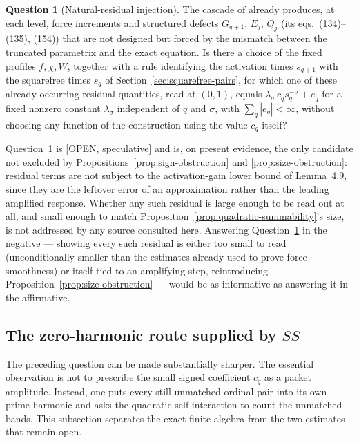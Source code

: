 \documentclass[11pt]{amsart}
\numberwithin{equation}{section}
\theoremstyle{plain}
\theoremstyle{definition}
\newtheorem{question}[theorem]{Question}
\theoremstyle{remark}
\begin{document}
\begin{question}[Natural-residual injection]
\label{q:natural-residual}
The cascade of \cite{AlpogeBuckmasterCoiculescu2026} already produces, at
each level, force increments and structured defects $G_{q+1}$, $E_j$, $Q_j$
(its eqs.~(134)--(135), (154)) that are not designed but forced by the
mismatch between the truncated parametrix and the exact equation.  Is there
a choice of the fixed profiles $f,\chi,W$, together with a rule identifying
the activation times $s_{q+1}$ with the squarefree times $s_q$ of
Section~\ref{sec:squarefree-pairs}, for which one of these already-occurring
residual quantities, read at $(0,1)$, equals $\lambda_\sigma\,c_qs_q^{-\sigma}+e_q$
for a fixed nonzero constant $\lambda_\sigma$ independent of $q$ and
$\sigma$, with $\sum_q|e_q|<\infty$, without choosing any function of the
construction using the value $c_q$ itself?
\end{question}

Question~\ref{q:natural-residual} is \textup{[OPEN, speculative]} and is, on
present evidence, the only candidate not excluded by
Propositions~\ref{prop:sign-obstruction} and \ref{prop:size-obstruction}:
residual terms are not subject to the activation-gain lower bound of
Lemma~4.9, since they are the leftover error of an approximation rather
than the leading amplified response.  Whether any such residual is large
enough to be read out at all, and small enough to match
Proposition~\ref{prop:quadratic-summability}'s size, is not addressed by any
source consulted here.  Answering Question~\ref{q:natural-residual} in the
negative --- showing every such residual is either too small to read
(unconditionally smaller than the estimates already used to prove force
smoothness) or itself tied to an amplifying step, reintroducing
Proposition~\ref{prop:size-obstruction} --- would be as informative as
answering it in the affirmative.

\subsection{The zero-harmonic route supplied by \texorpdfstring{$SS$}{SS}}
\label{subsec:SS-zero-mode}

The preceding question can be made substantially sharper.  The essential
observation is not to prescribe the small signed coefficient $c_q$ as a
packet amplitude.  Instead, one puts every still-unmatched ordinal pair into
its own prime harmonic and asks the quadratic self-interaction to count the
unmatched bands.  This subsection separates the exact finite algebra from
the two estimates that remain open.
\end{document}
